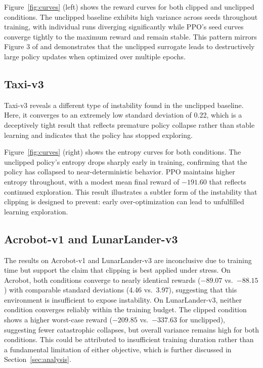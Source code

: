 \documentclass{article}
\begin{document}
Figure~\ref{fig:curves} (left) shows the reward curves for both clipped and unclipped conditions. The unclipped baseline exhibits high variance across seeds throughout training, with individual runs diverging significantly while PPO's seed curves converge tightly to the maximum reward and remain stable. This pattern mirrors Figure 3 of \citet{schulman2017ppo} and demonstrates that the unclipped surrogate leads to destructively large policy updates when optimized over multiple epochs.

\subsection{Taxi-v3}

Taxi-v3 reveals a different type of instability found in the unclipped baseline. Here, it converges to an extremely low standard deviation of 0.22, which is a deceptively tight result that reflects premature policy collapse rather than stable learning and indicates that the policy has stopped exploring.

Figure~\ref{fig:curves} (right) shows the entropy curves for both conditions. The unclipped policy's entropy drops sharply early in training, confirming that the policy has collapsed to near-deterministic behavior. PPO maintains higher entropy throughout, with a modest mean final reward of $-191.60$ that reflects continued exploration. This result illustrates a subtler form of the instability that clipping is designed to prevent: early over-optimization can lead to unfulfilled learning exploration.

\subsection{Acrobot-v1 and LunarLander-v3}

The results on Acrobot-v1 and LunarLander-v3 are inconclusive due to training time but support the claim that clipping is best applied under stress. On Acrobot, both conditions converge to nearly identical rewards ($-89.07$ vs.\ $-88.15$) with comparable standard deviations (4.46 vs.\ 3.97), suggesting that this environment is insufficient to expose instability. On LunarLander-v3, neither condition converges reliably within the training budget. The clipped condition shows a higher worst-case reward ($-209.85$ vs.\ $-337.63$ for unclipped), suggesting fewer catastrophic collapses, but overall variance remains high for both conditions. This could be attributed to insufficient training duration rather than a fundamental limitation of either objective, which is further discussed in Section~\ref{sec:analysis}.
\end{document}
